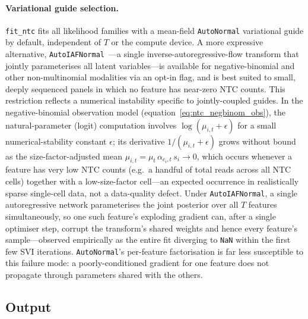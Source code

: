 \documentclass[12pt]{article}
\begin{document}
\paragraph{Variational guide selection.}
\texttt{fit\_ntc} fits all likelihood families with a mean-field \texttt{AutoNormal}
variational guide by default, independent of $T$ or the compute device.
A more expressive alternative, \texttt{AutoIAFNormal}~\cite{bingham2019pyro}—a single
inverse-autoregressive-flow transform that jointly parameterises all latent
variables—is available for negative-binomial and other non-multinomial modalities via
an opt-in flag, and is best suited to small, deeply sequenced panels in which no
feature has near-zero NTC counts.
This restriction reflects a numerical instability specific to jointly-coupled guides.
In the negative-binomial observation model (equation~\ref{eq:ntc_negbinom_obs}), the
natural-parameter (logit) computation involves $\log(\mu_{i,t} + \epsilon)$ for a small
numerical-stability constant $\epsilon$; its derivative $1/(\mu_{i,t} + \epsilon)$ grows
without bound as the size-factor-adjusted mean $\mu_{i,t} = \mu_t\,\alpha_{c_i,t}\,s_i
\to 0$, which occurs whenever a feature has very low NTC counts (e.g.\ a handful of
total reads across all NTC cells) together with a low-size-factor cell—an expected
occurrence in realistically sparse single-cell data, not a data-quality defect.
Under \texttt{AutoIAFNormal}, a single autoregressive network parameterises the joint
posterior over all $T$ features simultaneously, so one such feature's exploding
gradient can, after a single optimiser step, corrupt the transform's shared weights and
hence every feature's sample—observed empirically as the entire fit diverging to
\texttt{NaN} within the first few SVI iterations.
\texttt{AutoNormal}'s per-feature factorisation is far less susceptible to this failure
mode: a poorly-conditioned gradient for one feature does not propagate through
parameters shared with the others.

\subsection{Output}
\end{document}
